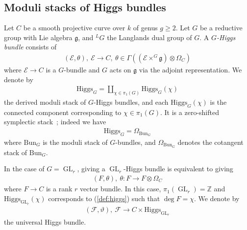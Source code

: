 \documentclass[11pt,oneside,a4paper,mathscr]{amsart}
\theoremstyle{definition}
\renewcommand{\geq}{\geqslant}
\newcommand{\cF}{\mathcal{F}}
\newcommand{\GL}{\operatorname{GL}}
\newcommand{\Hig}{\mathrm{Higgs}}
\newcommand{\Bun}{\mathrm{Bun}}
\begin{document}
\subsection{Moduli stacks of Higgs bundles}\label{subsec:higgs}
Let $C$ be a smooth projective curve over $k$ of genus $g\geq 2$.
Let $G$ be a reductive group with Lie algebra $\mathfrak{g}$, and $^{L}G$ the Langlands dual group
of $G$. 
A \textit{$G$-Higgs bundle} consists of 
\begin{align*}
    (\mathcal{E}, \theta), \ \mathcal{E} \to C, \ \theta \in \Gamma((\mathcal{E}\times^G \mathfrak{g})\otimes \Omega_C)
\end{align*}
where $\mathcal{E} \to C$ is a $G$-bundle and $G$ acts on $\mathfrak g$ via the adjoint representation.
We denote by 
\begin{align*}
    \Hig_{G}=\coprod_{\chi\in \pi_1(G)} \Hig_{G}(\chi)
\end{align*}
the derived moduli stack of $G$-Higgs bundles, 
and each $\Hig_{G}(\chi)$ is the connected component 
corresponding to $\chi \in \pi_1(G)$. 
It is a zero-shifted symplectic stack~\cite{PTVV}; indeed we have 
\begin{align*}
    \Hig_G=\Omega_{\Bun_G}
\end{align*}
where $\Bun_G$ is the moduli stack of $G$-bundles, and $\Omega_{\Bun_G}$ denotes the cotangent stack of $\Bun_G$.

In the case of $G=\GL_r$, giving a $\GL_r$-Higgs bundle is 
equivalent to giving 
\begin{align}\label{def:higgs}
    (F, \theta), \ \theta \colon F\to F\otimes \Omega_C
\end{align}
where $F \to C$ is a rank $r$ vector bundle. 
In this case, $\pi_1(\GL_r)=\mathbb{Z}$ and $\Hig_{\GL_r}(\chi)$ 
corresponds to (\ref{def:higgs}) such that $\deg F=\chi$. 
We denote by 
\begin{align}\label{univ:F}
    (\cF, \vartheta), \ \cF \to C \times \Hig_{\GL_r}
\end{align}
the universal Higgs bundle. 
\end{document}
